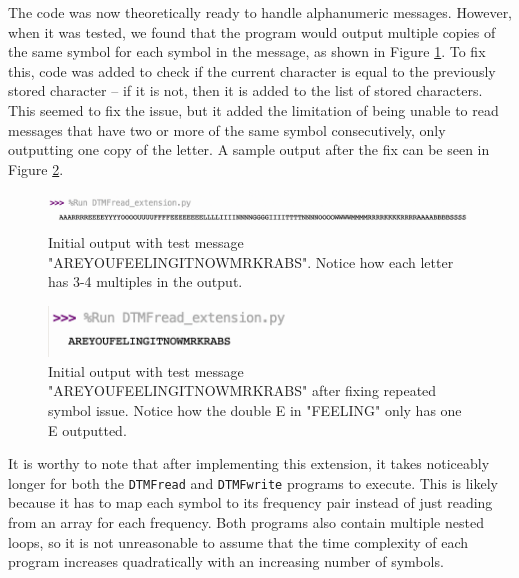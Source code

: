 \documentclass[12pt]{iopart}
\begin{document}
The code was now theoretically ready to handle alphanumeric messages.
However, when it was tested, we found that the program would output multiple copies of the same symbol for each symbol in the message, as shown in Figure \ref{fig:extension_output_bad}.
To fix this, code was added to check if the current character is equal to the previously stored character -- if it is not, then it is added to the list of stored characters.
This seemed to fix the issue, but it added the limitation of being unable to read messages that have two or more of the same symbol consecutively, only outputting one copy of the letter.
A sample output after the fix can be seen in Figure \ref{fig:extension_output}.

\begin{figure}[h!tbp]
  \begin{center}
 \item[]\includegraphics[width=1\textwidth]{extension_output_bad.png}
  \caption{\label{fig:extension_output_bad}
  Initial output with test message "AREYOUFEELINGITNOWMRKRABS". 
  Notice how each letter has 3-4 multiples in the output.
  }
  \end{center}
\end{figure}

\begin{figure}[h!tbp]
  \begin{center}
 \item[]\includegraphics[width=0.6\textwidth]{extension_output.png}
  \caption{\label{fig:extension_output}
  Initial output with test message "AREYOUFEELINGITNOWMRKRABS" after fixing repeated symbol issue. Notice how the double E in "FEELING" only has one E outputted.
  }
  \end{center}
\end{figure}

It is worthy to note that after implementing this extension, it takes noticeably longer for both the \verb|DTMFread| and \verb|DTMFwrite| programs to execute.
This is likely because it has to map each symbol to its frequency pair instead of just reading from an array for each frequency.
Both programs also contain multiple nested loops, so it is not unreasonable to assume that the time complexity of each program increases quadratically with an increasing number of symbols.
\end{document}

